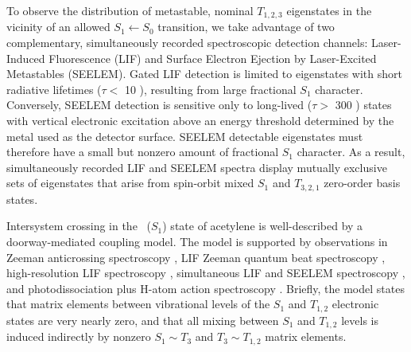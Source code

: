 \documentclass[12pt]{mitthesis}
\begin{document}
To observe the distribution of metastable, nominal $T_{1,2,3}$
eigenstates in the vicinity of an allowed $S_1 \leftarrow S_0$
transition, we take advantage of two complementary, simultaneously
recorded spectroscopic detection channels: Laser-Induced Fluorescence
(LIF) and Surface Electron Ejection by Laser-Excited Metastables
(SEELEM).  Gated LIF detection is limited to eigenstates with short
radiative lifetimes ($\tau <$ 10 \microsec), resulting from large
fractional $S_1$ character.  Conversely, SEELEM detection is sensitive
only to long-lived ($\tau >$ 300 \microsec) states with vertical
electronic excitation above an energy threshold determined by the
metal used as the detector surface.  SEELEM detectable eigenstates
must therefore have a small but nonzero amount of fractional $S_1$
character.  As a result, simultaneously recorded LIF and SEELEM
spectra display mutually exclusive sets of eigenstates that arise from
spin-orbit mixed $S_1$ and $T_{3,2,1}$ zero-order basis states.

Intersystem crossing in the \astate\ ($S_1$) state of acetylene is
well-described by a doorway-mediated coupling model.  The model is
supported by observations in Zeeman anticrossing spectroscopy
\cite{dupre91, dupre95a, dupre95b}, LIF Zeeman quantum beat
spectroscopy \cite{ochi87, ochi91, dupre93}, high-resolution LIF
spectroscopy \cite{drabbels94, altunata01}, simultaneous LIF and
SEELEM spectroscopy \cite{humphrey97, altunata00, mishra04}, and
photodissociation plus H-atom action spectroscopy \cite{yamakita03,
  loffler98, mordaunt98}.  Briefly, the model states that matrix
elements between vibrational levels of the $S_1$ and $T_{1,2}$
electronic states are very nearly zero, and that all mixing between
$S_1$ and $T_{1,2}$ levels is induced indirectly by nonzero $S_1 \sim
T_3$ and $T_3 \sim T_{1,2}$ matrix elements.

\end{document}
